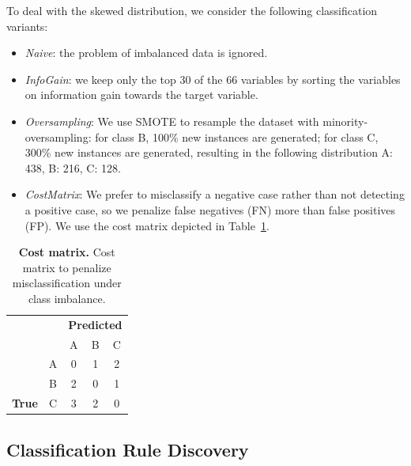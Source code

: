 \documentclass[
  oneside]{book}
\providecommand{\tightlist}{%
  \setlength{\itemsep}{0pt}\setlength{\parskip}{0pt}}
\begin{document}
To deal with the skewed distribution, we consider the following classification variants:

\begin{itemize}
\tightlist
\item
  \emph{Naive}: the problem of imbalanced data is ignored.
\item
  \emph{InfoGain}: we keep only the top 30 of the 66 variables by sorting the variables on information gain towards the target variable.
\item
  \emph{Oversampling}: We use SMOTE \autocite{CBHea02} to resample the dataset with minority-oversampling: for class B, 100\% new instances are generated; for class C, 300\% new instances are generated, resulting in the following distribution A: 438, B: 216, C: 128.
\item
  \emph{CostMatrix}: We prefer to misclassify a negative case rather than not detecting a positive case, so we penalize false negatives (FN) more than false positives (FP).
  We use the cost matrix depicted in Table~\ref{tab:03-costmatrix}.
\end{itemize}



\begin{table}

\caption{\label{tab:03-costmatrix}\textbf{Cost matrix.} Cost matrix to penalize misclassification under class imbalance.}
\centering
\begin{tabular}[t]{>{}ccccc}
\toprule
\multicolumn{2}{c}{\textbf{ }} & \multicolumn{3}{c}{\textbf{Predicted}} \\
\cmidrule(l{3pt}r{3pt}){3-5}
   &   & A & B & C\\
\midrule
 & A & 0 & 1 & 2\\

 & B & 2 & 0 & 1\\

\multirow{-3}{*}{\centering\arraybackslash \textbf{True}} & C & 3 & 2 & 0\\
\bottomrule
\end{tabular}
\end{table}

\hypertarget{imm-workflow-rule-discovery}{%
\subsection{Classification Rule Discovery}\label{imm-workflow-rule-discovery}}
\end{document}
